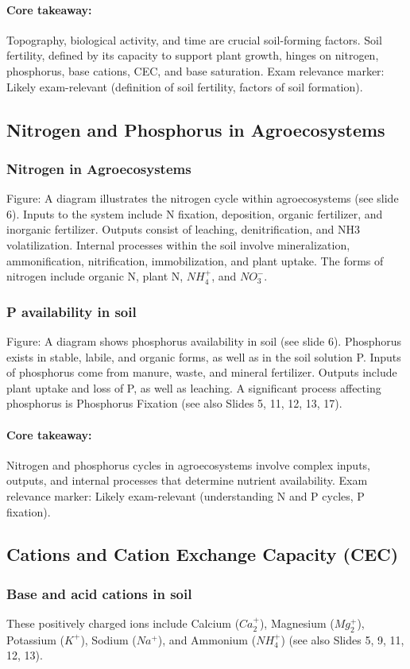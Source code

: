 \paragraph*{Core takeaway:} 
Topography, biological activity, and time are crucial soil-forming factors. Soil fertility, defined by its capacity to support plant growth, hinges on nitrogen, phosphorus, base cations, CEC, and base saturation. Exam relevance marker: Likely exam-relevant (definition of soil fertility, factors of soil formation).

\subsection{Nitrogen and Phosphorus in Agroecosystems} \subsubsection*{Nitrogen in Agroecosystems} 
Figure: A diagram illustrates the nitrogen cycle within agroecosystems (see slide 6). Inputs to the system include N fixation, deposition, organic fertilizer, and inorganic fertilizer. Outputs consist of leaching, denitrification, and NH3 volatilization. Internal processes within the soil involve mineralization, ammonification, nitrification, immobilization, and plant uptake. The forms of nitrogen include organic N, plant N, $NH_4^+$, and $NO_3^-$.

\subsubsection*{P availability in soil} 
Figure: A diagram shows phosphorus availability in soil (see slide 6). Phosphorus exists in stable, labile, and organic forms, as well as in the soil solution P. Inputs of phosphorus come from manure, waste, and mineral fertilizer. Outputs include plant uptake and loss of P, as well as leaching. A significant process affecting phosphorus is Phosphorus Fixation (see also Slides 5, 11, 12, 13, 17).

\paragraph*{Core takeaway:} 
Nitrogen and phosphorus cycles in agroecosystems involve complex inputs, outputs, and internal processes that determine nutrient availability. Exam relevance marker: Likely exam-relevant (understanding N and P cycles, P fixation).

\subsection{Cations and Cation Exchange Capacity (CEC)} \subsubsection*{Base and acid cations in soil} 
 These positively charged ions include Calcium ($Ca_2^+$), Magnesium ($Mg_2^+$), Potassium ($K^+$), Sodium ($Na^+$), and Ammonium ($NH_4^+$) (see also Slides 5, 9, 11, 12, 13).

